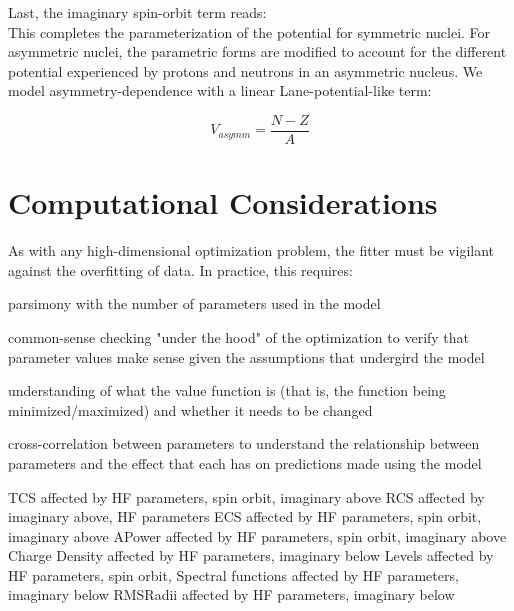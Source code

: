 \noindent
Last, the imaginary spin-orbit term reads:
\begin{equation}
    [insert imaginary spin-orbit]
\end{equation}
This completes the parameterization of the potential for symmetric nuclei. For asymmetric nuclei,
the parametric forms are modified to account for the different potential experienced by protons and
neutrons in an asymmetric nucleus. We model asymmetry-dependence with a linear Lane-potential-like
term:

\begin{equation}
    V_{asymm} = \frac{N-Z}{A}
\end{equation}

\section{Computational Considerations}
As with any high-dimensional optimization problem, the fitter must be vigilant
against the overfitting of data. In practice, this requires:

parsimony with the number of parameters used in the model

common-sense checking "under the hood" of the optimization to verify that
parameter values make sense given the assumptions that undergird the model

understanding of what the value function is (that is, the function being
minimized/maximized) and whether it needs to be changed

cross-correlation between parameters to understand the relationship between
parameters and the effect that each has on predictions made using the model

TCS affected by HF parameters, spin orbit, imaginary above
RCS affected by imaginary above, HF parameters
ECS affected by HF parameters, spin orbit, imaginary above
APower affected by HF parameters, spin orbit,  imaginary above
Charge Density affected by HF parameters, imaginary below
Levels affected by HF parameters, spin orbit,
Spectral functions affected by HF parameters, imaginary below
RMSRadii affected by HF parameters, imaginary below

